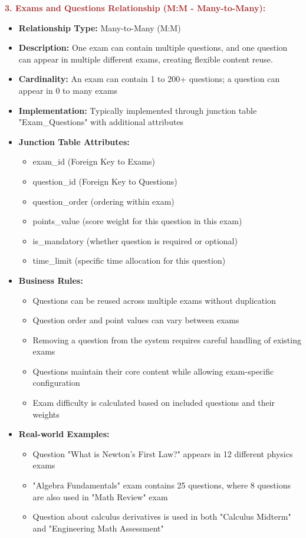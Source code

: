 \documentclass[12pt,a4paper,oneside]{book}
\begin{document}
\textbf{\textcolor{brown}{3. Exams and Questions Relationship (M:M - Many-to-Many):}}
\begin{itemize}
    \item \textbf{Relationship Type:} Many-to-Many (M:M)
    \item \textbf{Description:} One exam can contain multiple questions, and one question can appear in multiple different exams, creating flexible content reuse.
    \item \textbf{Cardinality:} An exam can contain 1 to 200+ questions; a question can appear in 0 to many exams
    \item \textbf{Implementation:} Typically implemented through junction table "Exam\_Questions" with additional attributes
    \item \textbf{Junction Table Attributes:}
        \begin{itemize}
            \item exam\_id (Foreign Key to Exams)
            \item question\_id (Foreign Key to Questions)
            \item question\_order (ordering within exam)
            \item points\_value (score weight for this question in this exam)
            \item is\_mandatory (whether question is required or optional)
            \item time\_limit (specific time allocation for this question)
        \end{itemize}
    \item \textbf{Business Rules:}
        \begin{itemize}
            \item Questions can be reused across multiple exams without duplication
            \item Question order and point values can vary between exams
            \item Removing a question from the system requires careful handling of existing exams
            \item Questions maintain their core content while allowing exam-specific configuration
            \item Exam difficulty is calculated based on included questions and their weights
        \end{itemize}
    \item \textbf{Real-world Examples:}
        \begin{itemize}
            \item Question "What is Newton's First Law?" appears in 12 different physics exams
            \item "Algebra Fundamentals" exam contains 25 questions, where 8 questions are also used in "Math Review" exam
            \item Question about calculus derivatives is used in both "Calculus Midterm" and "Engineering Math Assessment"
        \end{itemize}
\end{itemize}
\end{document}
